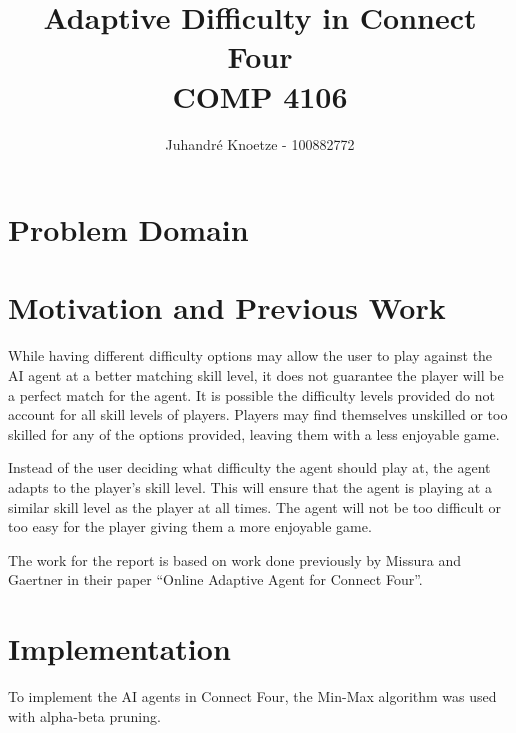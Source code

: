 \documentclass[12pt]{article}
\title{
    \vfill
    Adaptive Difficulty in Connect Four \\
    COMP 4106
}
\author{
    Juhandr\'{e} Knoetze - 100882772
}
\begin{document}
\begin{titlepage}
    \maketitle
    \vfill
    \thispagestyle{empty}
\end{titlepage}






\section*{Problem Domain}


\section*{Motivation and Previous Work}
While having different difficulty options may allow the user to play against the AI agent at a better matching skill level, it does not guarantee the player will be a perfect match for the agent. It is possible the difficulty levels provided do not account for all skill levels of players. Players may find themselves unskilled or too skilled for any of the options provided, leaving them with a less enjoyable game.

Instead of the user deciding what difficulty the agent should play at, the agent adapts to the player's skill level. This will ensure that the agent is playing at a similar skill level as the player at all times. The agent will not be too difficult or too easy for the player giving them a more enjoyable game.

The work for the report is based on work done previously by Missura and Gaertner in their paper ``Online Adaptive Agent for Connect Four''.

\section*{Implementation}
To implement the AI agents in Connect Four, the Min-Max algorithm was used with alpha-beta pruning.
\end{document}
